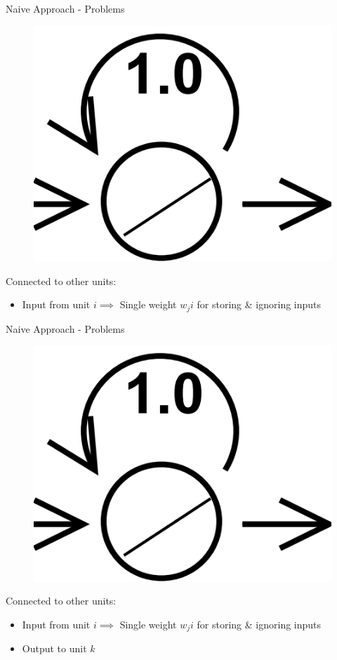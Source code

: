 \documentclass[10pt, aspectratio=169]{beamer}
\begin{document}
\begin{frame}[t]{Naive Approach - Problems}
\begin{figure}
        \centering
        \includegraphics[width=0.25\linewidth]{images/ConstantErrorCarousel.png}
    \end{figure}
Connected to other units:
\begin{itemize}
    \item Input from unit \begin{math}i\implies\end{math}  Single weight \begin{math}w_ji\end{math} for storing \& ignoring inputs
\end{itemize}
\end{frame}

\begin{frame}[t]{Naive Approach - Problems}
\begin{figure}
        \centering
        \includegraphics[width=0.25\linewidth]{images/ConstantErrorCarousel.png}
    \end{figure}
Connected to other units:
\begin{itemize}
    \item Input from unit \begin{math}i\implies\end{math} Single weight \begin{math}w_ji\end{math} for storing \& ignoring inputs
    \item Output to unit \begin{math}k\end{math}
\end{itemize}
\end{frame}
\end{document}

